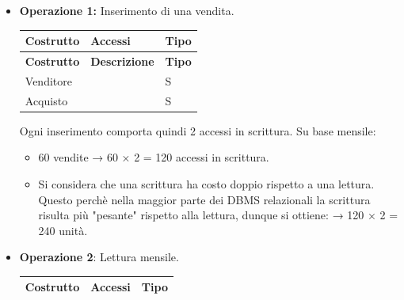 \begin{itemize}
    \item{ \textbf{Operazione 1:} Inserimento di una vendita.

       \begin{longtable}{|
            >{\centering\arraybackslash}m{2cm}|
            >{\centering\arraybackslash}m{1.5cm}|
            >{\centering\arraybackslash}m{1cm}|
            }
            
            \hline
            \textbf{Costrutto} & \textbf{Accessi} & \textbf{Tipo} \\
            \hline
            \endfirsthead
            
            \hline
            \textbf{Costrutto} & \textbf{Descrizione} & \textbf{Tipo} \\
            \hline
            \endhead
            
            Venditore & 1 & S \\
            \hline
            
            Acquisto & 1 & S \\
            \hline
            
        \end{longtable}

        Ogni inserimento comporta quindi 2 accessi in scrittura.
        Su base mensile:

        \begin{itemize}
            \renewcommand{\labelitemii}{$\circ$}
            \item 60 vendite → 60 × 2 = 120 accessi in scrittura.
            \item Si considera che una scrittura ha costo doppio rispetto a una lettura. Questo perchè nella maggior parte dei DBMS relazionali la scrittura risulta più "pesante" rispetto alla lettura, dunque si ottiene: → 120 × 2 = 240 unità.
        \end{itemize}
    }
    
    \item {\textbf{Operazione 2}: Lettura mensile.

        \begin{longtable}{|
                >{\centering\arraybackslash}m{2cm}|
                >{\centering\arraybackslash}m{1.5cm}|
                >{\centering\arraybackslash}m{1cm}|
                }
                
                \hline
                \textbf{Costrutto} & \textbf{Accessi} & \textbf{Tipo} \\
                \hline
                \endfirsthead
                

\end{longtable}}
\end{itemize}
